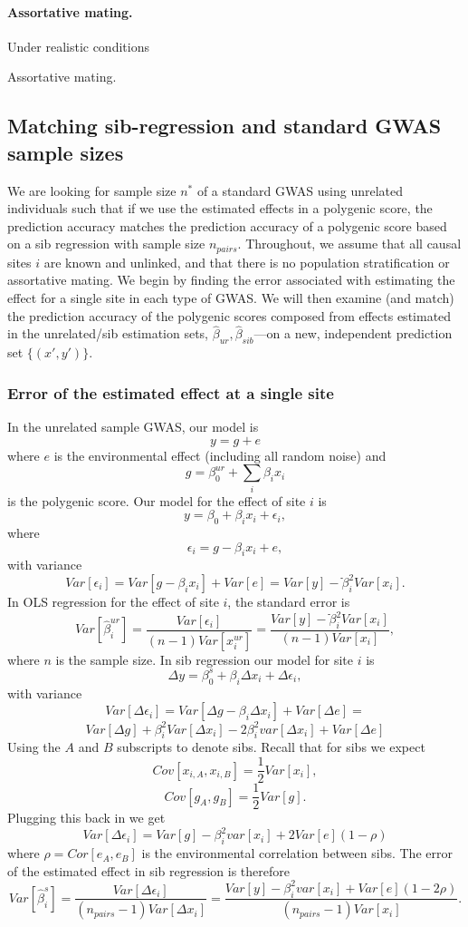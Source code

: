 \documentclass[hidelinks, 12pt]{article}
\begin{document}
\paragraph{Assortative mating.}

Under realistic conditions

Assortative mating.

\subsection{Matching sib-regression and standard GWAS sample sizes}
We are looking for sample size $n^*$ of a standard GWAS using unrelated individuals such that if we use the estimated effects in a polygenic score, the prediction accuracy matches the prediction accuracy of a polygenic score based on a sib regression with sample size $n_{pairs}$. Throughout, we assume that all causal sites $i$ are known and unlinked, and that there is no population stratification or assortative mating.  We begin by finding the error associated with estimating the effect for a single site in each type of GWAS.  We will then examine (and match) the prediction accuracy of the polygenic scores composed from effects estimated in the unrelated/sib estimation sets, $\hat{\beta}_{ur},\hat{\beta}_{sib}$---on a new, independent prediction set $\{(x',y')\}$.

\subsubsection{Error of the estimated effect at a single site}
In the unrelated sample GWAS, our model is
$$y=g+e$$
where $e$ is the environmental effect (including all random noise) and
$$g=\beta^{ur}_0+\sum_{i}\beta_ix_i$$ 
is the polygenic score.  Our model for the effect of site $i$ is 
\begin{equation}
\label{ols_model}
y=\beta_0+\beta_ix_i+\epsilon_i,
\end{equation}
where 
$$\epsilon_i=g-\beta_i x_i+e,$$
with variance
$$Var[\epsilon_i]=Var[g-\beta_i x_i]+Var[e] = Var[y]-ֿ\beta_i^2Var[x_i].$$
In OLS regression for the effect of site $i$, the standard error is
$$Var[\hat{\beta}^{ur}_i]=\frac{Var[\epsilon_i]}{(n-1) Var[x_i^{ur}]} = \frac{Var[y]-ֿ\beta_i^2Var[x_i]}{(n-1)Var[x_i]},$$
where $n$ is the sample size.  In sib regression our model for site $i$ is
$$\Delta y=\beta^{s}_0+\beta_i \Delta x_i+\Delta \epsilon_i,$$
with variance
$$Var[\Delta \epsilon_i] = Var[\Delta g-\beta_i \Delta x_i] + Var[\Delta e] =$$
$$Var[\Delta g]+\beta_i^2Var[\Delta x_i]-2\beta_i^2var[\Delta x_i]+ Var[\Delta e]$$
Using the $A$ and $B$ subscripts to denote sibs. Recall that for sibs we expect
$$Cov[x_{i,A},x_{i,B}]=\frac{1}{2}Var[x_i],$$
$$Cov[g_A,g_B]=\frac{1}{2}Var[g].$$
Plugging this back in we get
$$Var[\Delta \epsilon_i] = Var[g] - \beta_i^2var[x_i] + 2Var[e](1-\rho) $$
where $\rho = Cor[e_A,e_B]$ is the environmental correlation between sibs. The error of the estimated effect in sib regression is therefore
$$Var[\hat{\beta}^{s}_i]=\frac{Var[\Delta \epsilon_i]}{(n_{pairs}-1) Var[\Delta x_i]} = \frac{Var[y] - \beta_i^2var[x_i] + Var[e](1-2\rho)}{(n_{pairs}-1) Var[x_i]}.$$
\end{document}
